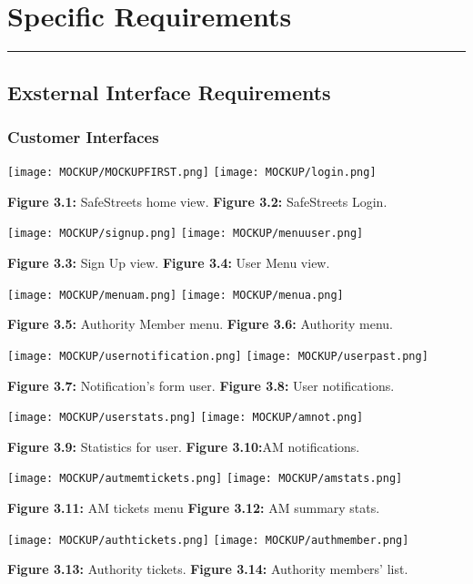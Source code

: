 \documentclass[12pt]{article}
\begin{document}
\newpage
\section{Specific Requirements}
\hrule
\vspace{8mm}
\subsection{Exsternal Interface Requirements}
\vspace{2mm}
\subsubsection{Customer Interfaces}
\vspace{3mm}
		 
		 \texttt{[image: MOCKUP/MOCKUPFIRST.png]}                  \hfill \texttt{[image: MOCKUP/login.png]}
		 
		 \textbf{Figure 3.1:} SafeStreets home view.  \hfill \textbf{Figure 3.2:} SafeStreets Login.
		
\newpage
 	 \texttt{[image: MOCKUP/signup.png]}                  \hfill \texttt{[image: MOCKUP/menuuser.png]}
		 
		 \textbf{Figure 3.3:} Sign Up view.  \hfill \textbf{Figure 3.4:} User Menu view.
		
  \texttt{[image: MOCKUP/menuam.png]}                  \hfill \texttt{[image: MOCKUP/menua.png]}
		 
		 \textbf{Figure 3.5:} Authority Member menu.  \hfill \textbf{Figure 3.6:} Authority menu.

\newpage
 	 \texttt{[image: MOCKUP/usernotification.png]}                  \hfill \texttt{[image: MOCKUP/userpast.png]}
		 
		 \textbf{Figure 3.7:} Notification's form user.  \hfill \textbf{Figure 3.8:} User notifications.
		
  \texttt{[image: MOCKUP/userstats.png]}                  \hfill \texttt{[image: MOCKUP/amnot.png]}
		 
		 \textbf{Figure 3.9:} Statistics for user.  \hfill \textbf{Figure 3.10:}AM notifications.


\newpage
 	 \texttt{[image: MOCKUP/autmemtickets.png]}                  \hfill \texttt{[image: MOCKUP/amstats.png]}
		 
		 \textbf{Figure 3.11:} AM tickets menu   \hfill \textbf{Figure 3.12:} AM summary stats.
		
  \texttt{[image: MOCKUP/authtickets.png]}                  \hfill \texttt{[image: MOCKUP/authmember.png]}
		 
		 \textbf{Figure 3.13:} Authority tickets.  \hfill \textbf{Figure 3.14:} Authority members' list.
\end{document}
